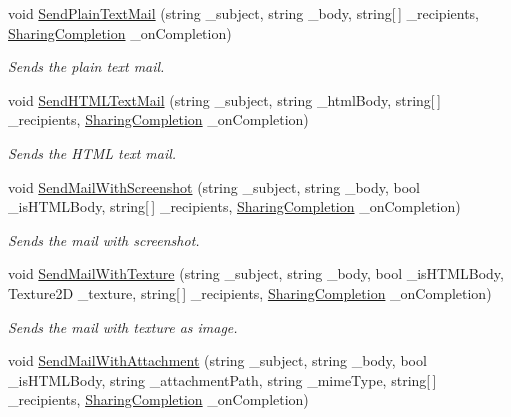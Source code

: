 \begin{DoxyCompactItemize}
void \hyperlink{class_voxel_busters_1_1_native_plugins_1_1_sharing_a68a3fb078986ea5f71119f416c366697}{Send\+Plain\+Text\+Mail} (string \+\_\+subject, string \+\_\+body, string\mbox{[}$\,$\mbox{]} \+\_\+recipients, \hyperlink{class_voxel_busters_1_1_native_plugins_1_1_sharing_a61017c6d51721d2ca6154ffef15a6555}{Sharing\+Completion} \+\_\+on\+Completion)
\begin{DoxyCompactList}\small\item\em Sends the plain text mail. \end{DoxyCompactList}\item 
void \hyperlink{class_voxel_busters_1_1_native_plugins_1_1_sharing_a6f3de8d5bce52dbee8e1f9f837da46b3}{Send\+H\+T\+M\+L\+Text\+Mail} (string \+\_\+subject, string \+\_\+html\+Body, string\mbox{[}$\,$\mbox{]} \+\_\+recipients, \hyperlink{class_voxel_busters_1_1_native_plugins_1_1_sharing_a61017c6d51721d2ca6154ffef15a6555}{Sharing\+Completion} \+\_\+on\+Completion)
\begin{DoxyCompactList}\small\item\em Sends the H\+T\+M\+L text mail. \end{DoxyCompactList}\item 
void \hyperlink{class_voxel_busters_1_1_native_plugins_1_1_sharing_a796846192e8722927b48912c9a116490}{Send\+Mail\+With\+Screenshot} (string \+\_\+subject, string \+\_\+body, bool \+\_\+is\+H\+T\+M\+L\+Body, string\mbox{[}$\,$\mbox{]} \+\_\+recipients, \hyperlink{class_voxel_busters_1_1_native_plugins_1_1_sharing_a61017c6d51721d2ca6154ffef15a6555}{Sharing\+Completion} \+\_\+on\+Completion)
\begin{DoxyCompactList}\small\item\em Sends the mail with screenshot. \end{DoxyCompactList}\item 
void \hyperlink{class_voxel_busters_1_1_native_plugins_1_1_sharing_a009ff4ad8bf14ee001f690c30f6befe4}{Send\+Mail\+With\+Texture} (string \+\_\+subject, string \+\_\+body, bool \+\_\+is\+H\+T\+M\+L\+Body, Texture2\+D \+\_\+texture, string\mbox{[}$\,$\mbox{]} \+\_\+recipients, \hyperlink{class_voxel_busters_1_1_native_plugins_1_1_sharing_a61017c6d51721d2ca6154ffef15a6555}{Sharing\+Completion} \+\_\+on\+Completion)
\begin{DoxyCompactList}\small\item\em Sends the mail with texture as image. \end{DoxyCompactList}\item 
void \hyperlink{class_voxel_busters_1_1_native_plugins_1_1_sharing_abf6aae8f21b460f1d6a0192f634db78e}{Send\+Mail\+With\+Attachment} (string \+\_\+subject, string \+\_\+body, bool \+\_\+is\+H\+T\+M\+L\+Body, string \+\_\+attachment\+Path, string \+\_\+mime\+Type, string\mbox{[}$\,$\mbox{]} \+\_\+recipients, \hyperlink{class_voxel_busters_1_1_native_plugins_1_1_sharing_a61017c6d51721d2ca6154ffef15a6555}{Sharing\+Completion} \+\_\+on\+Completion)

\end{DoxyCompactItemize}
